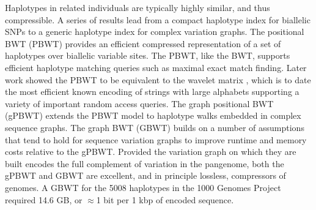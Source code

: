 Haplotypes in related individuals are typically highly similar, and thus compressible.
A series of results lead from a compact haplotype index for biallelic SNPs to a generic haplotype index for complex variation graphs.
The positional BWT (PBWT) \cite{Durbin_2014} provides an efficient compressed representation of a set of haplotypes over biallelic variable sites.
The PBWT, like the BWT, supports efficient haplotype matching queries such as maximal exact match finding.
Later work \cite{Gagie_2017} showed the PBWT to be equivalent to the wavelet matrix \cite{Claude_2015}, which is to date the most efficient known encoding of strings with large alphabets supporting a variety of important random access queries.
The graph positional BWT (gPBWT) \cite{Novak_2017} extends the PBWT model to haplotype walks embedded in complex sequence graphs.
The graph BWT (GBWT) \cite{siren2018haplotype} builds on a number of assumptions that tend to hold for sequence variation graphs to improve runtime and memory costs relative to the gPBWT.
Provided the variation graph on which they are built encodes the full complement of variation in the pangenome, both the gPBWT and GBWT are excellent, and in principle lossless, compressors of genomes.
A GBWT for the 5008 haplotypes in the 1000 Genomes Project required 14.6 GB, or $\approx$1 bit per 1 kbp of encoded sequence.



